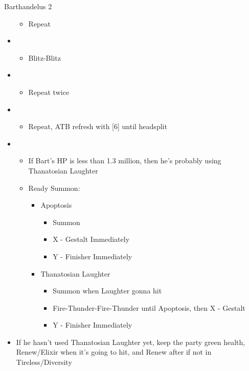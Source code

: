 \begin{battle}[2:30 $|$ 2:15]{Barthandelus 2}
\begin{multicols}{2}
\begin{itemize}
\begin{itemize}
				      \item Repeat
			      \end{itemize}
			\item \second
			      \begin{itemize}
				      \item Blitz-Blitz
			      \end{itemize}
			\item \sixth
			      \begin{itemize}
				      \item Repeat twice
			      \end{itemize}
			\item \fourth
			      \begin{itemize}
				      \item Repeat, ATB refresh with [6] until headsplit
			      \end{itemize}
			\item \fifth
			      \begin{itemize}
				      \item If Bart's HP is less than 1.3 million, then he's probably using Thanatosian Laughter
				      \item Ready Summon:
				            \begin{itemize}
					            \item Apoptosis
					                  \begin{itemize}
						                  \item Summon
						                  \item X - Gestalt Immediately
						                  \item Y - Finisher Immediately
					                  \end{itemize}
					            \item Thanatosian Laughter
					                  \begin{itemize}
						                  \item Summon when Laughter gonna hit
						                  \item Fire-Thunder-Fire-Thunder until Apoptosis, then X - Gestalt
						                  \item Y - Finisher Immediately
					                  \end{itemize}
				            \end{itemize}
			      \end{itemize}
			      \columnbreak
			\item If he hasn't used Thanatosian Laughter yet, keep the party green health, Renew/Elixir when it's going to hit, and Renew after if not in Tireless/Diversity

\end{itemize}
\end{multicols}
\end{battle}
